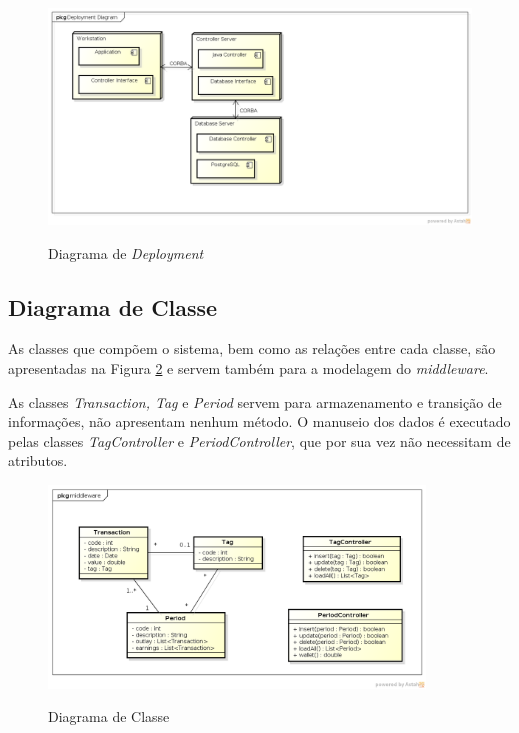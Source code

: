 	\begin{figure}[htb]
		\caption{Diagrama de \textit{Deployment}}
		{\parbox{6cm}{
				\includegraphics[width=14cm]{images/DeploymentDiagram.png}
				\label{Diagrama-Deployment}
		}}
	\end{figure}

\subsection{Diagrama de Classe}
	As classes que compõem o sistema, bem como as relações entre cada classe, são apresentadas
	na Figura \ref{Diagrama-Classe} e servem também para a modelagem do \textit{middleware}.
	
	As classes \textit{Transaction, Tag} e \textit{Period} servem para armazenamento e transição de informações, não apresentam nenhum método. O manuseio dos dados é executado pelas classes \textit{TagController} e \textit{PeriodController}, que por sua vez não necessitam de atributos.
	
	\begin{figure}[!htb]
		\caption{Diagrama de Classe}
		{\parbox{6cm}{
				\includegraphics[width=10cm]{images/ClassDiagram.png}
				\label{Diagrama-Classe}
		}}
	\end{figure}

